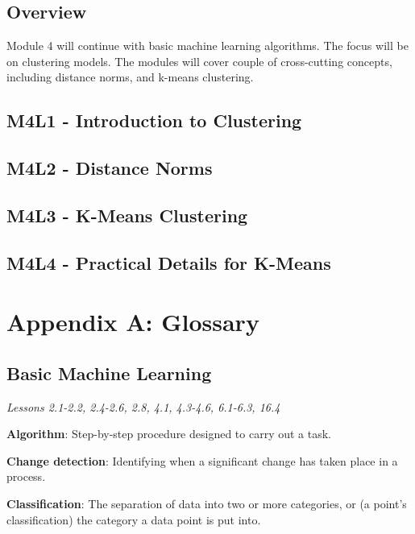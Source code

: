 \documentclass[
]{book}
\begin{document}
\section{Overview}\label{overview-1}

Module 4 will continue with basic machine learning algorithms.
The focus will be on clustering models.
The modules will cover couple of cross-cutting concepts, including distance norms, and k-means clustering.

\section{M4L1 - Introduction to Clustering}\label{m4l1---introduction-to-clustering}

\section{M4L2 - Distance Norms}\label{m4l2---distance-norms}

\section{M4L3 - K-Means Clustering}\label{m4l3---k-means-clustering}

\section{M4L4 - Practical Details for K-Means}\label{m4l4---practical-details-for-k-means}

\chapter{Appendix A: Glossary}\label{appendix-a-glossary}

\section{Basic Machine Learning}\label{basic-machine-learning}

\emph{Lessons 2.1-2.2, 2.4-2.6, 2.8, 4.1, 4.3-4.6, 6.1-6.3, 16.4}

\textbf{Algorithm}: Step-by-step procedure designed to carry out a task.

\textbf{Change detection}: Identifying when a significant change has taken place in a process.

\textbf{Classification}: The separation of data into two or more categories, or (a point's classification) the category a data point is put into.
\end{document}
